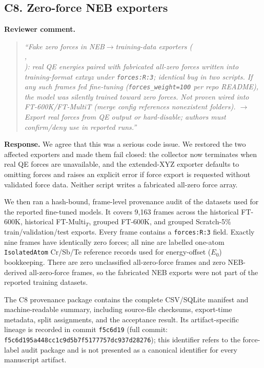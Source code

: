\documentclass[11pt,a4paper]{article}
\begin{document}
\subsection*{C8. Zero-force NEB exporters}

\noindent\textbf{Reviewer comment.}
\begin{quote}
\itshape
``Fake zero forces in NEB$\rightarrow$training-data exporters (\\, \\): real QE energies paired with fabricated all-zero forces written into training-format extxyz under \texttt{forces:R:3}; identical bug in two scripts. If any such frames fed fine-tuning (\texttt{forces\_weight=100} per repo README), the model was silently trained toward zero forces. Not proven wired into FT-600K/FT-MultiT (merge config references nonexistent folders). $\rightarrow$ Export real forces from QE output or hard-disable; authors must confirm/deny use in reported runs.''
\end{quote}

\noindent\textbf{Response.}
We agree that this was a serious code issue. We restored the two affected exporters and made them fail closed: the collector now terminates when real QE forces are unavailable, and the extended-XYZ exporter defaults to omitting forces and raises an explicit error if force export is requested without validated force data. Neither script writes a fabricated all-zero force array.

We then ran a hash-bound, frame-level provenance audit of the datasets used for the reported fine-tuned models. It covers 9,163 frames across the historical FT-600K, historical FT-Multi$_T$, grouped FT-600K, and grouped Scratch-5\% train/validation/test exports. Every frame contains a \texttt{forces:R:3} field. Exactly nine frames have identically zero forces; all nine are labelled one-atom \texttt{IsolatedAtom} Cr/Sb/Te reference records used for energy-offset ($E_0$) bookkeeping. There are zero unclassified all-zero-force frames and zero NEB-derived all-zero-force frames, so the fabricated NEB exports were not part of the reported training datasets.

The C8 provenance package contains the complete CSV/SQLite manifest and machine-readable summary, including source-file checksums, export-time metadata, split assignments, and the acceptance result. Its artifact-specific lineage is recorded in commit \texttt{f5c6d19} (full commit: \texttt{f5c6d195\allowbreak{}a448cc1c\allowbreak{}9d5b7f51\allowbreak{}77757dc9\allowbreak{}37d28276}); this identifier refers to the force-label audit package and is not presented as a canonical identifier for every manuscript artifact.
\end{document}
